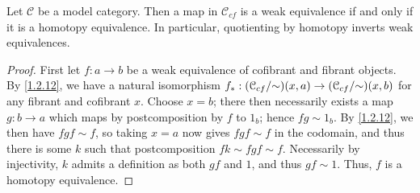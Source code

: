 \begin{proposition}\label{1.2.16}
	Let $\mathcal{C} $ be a model category. Then a map in $\mathcal{C} _{cf} $ is a weak equivalence if and only if it is a homotopy equivalence. In particular, quotienting by homotopy inverts weak equivalences.
\end{proposition}
\begin{proof}
	First let $f : a \to b$ be a weak equivalence of cofibrant and fibrant objects. By \cref{1.2.12}, we have a natural isomorphism $f_* : (\mathcal{C} _{cf} /\mathbin{\sim})(x,a) \to (\mathcal{C} _{cf} /\mathbin{\sim} )(x,b)$ for any fibrant and cofibrant $x$. Choose $x=b$; there then necessarily exists a map $g : b \to a$ which maps by postcomposition by $f$ to $1_b$; hence $fg\sim 1_b$. By \cref{1.2.12}, we then have $fgf\sim f$, so taking $x=a$ now gives $fgf\sim f$ in the codomain, and thus there is some $k$ such that postcomposition $f k \sim fgf \sim f$. Necessarily by injectivity, $k$ admits a definition as both $gf$ and $1$, and thus $gf\sim 1$. Thus, $f$ is a homotopy equivalence.


\end{proof}
